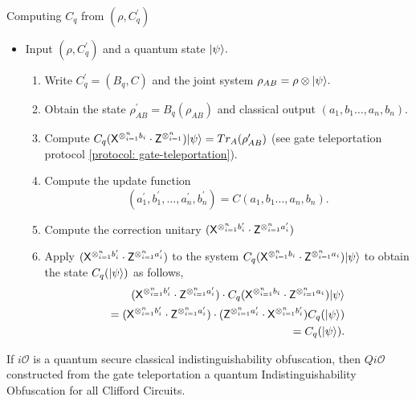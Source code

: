 \begin{algorithm}[H]
\label{Eval:Clifford-teleportation}
\caption{Computing $C_q$ from $\left(\rho,C_q^\prime \right)$}
 \begin{itemize}
  \item Input $\left(\rho,C_q^\prime \right)$ and a quantum state ${\lvert}\psi\rangle.$
  \begin{enumerate}
  \item   Write $C_q^\prime=(B_q, C)$ and the joint system $\rho_{AB}=\rho \otimes {\lvert}\psi\rangle.$
  \item   Obtain the state $\rho_{AB}^\prime=B_q(\rho_{AB})$ and classical output $(a_1,b_1\ldots,a_n,b_n).$ 
  \item   Compute $C_q({\sf X}^{\otimes_{i=1}^{n} b_{i}} \cdot {\sf Z}^{\otimes_{i=1}^{n}}){\lvert}\psi\rangle=Tr_A(\rho_{AB}^\prime)$ (see  gate teleportation protocol \ref{protocol: gate-teleportation}).
  \item   Compute the update function $$(a_1^\prime, b_1^\prime,\ldots, a_n^\prime, b_n^\prime)=C(a_1,b_1\ldots,a_n,b_n).$$
  \item    Compute the correction unitary $({\sf X}^{\otimes_{i=1}^{n} b_{i}^\prime} \cdot {\sf Z}^{\otimes_{i=1}^{n} a_{i}^\prime})$ 
  \item   Apply  $({\sf X}^{\otimes_{i=1}^{n} b_{i}^\prime} \cdot {\sf Z}^{\otimes_{i=1}^{n} a_{i}^\prime})$ to the system $C_q({\sf X}^{\otimes_{i=1}^{n} b_{i}} \cdot {\sf Z}^{\otimes_{i=1}^{n} a_{i}}){\lvert}\psi\rangle$ to obtain the state $C_q({\lvert}\psi\rangle)$ as follows,
  \begin{equation*}
  \begin{aligned}
 ({\sf X}^{\otimes_{i=1}^{n} b_{i}^\prime} \cdot {\sf Z}^{\otimes_{i=1}^{n} a_{i}^\prime}) \cdot C_q({\sf X}^{\otimes_{i=1}^{n} b_{i}} \cdot {\sf Z}^{\otimes_{i=1}^{n}a_{i}}){\lvert}\psi\rangle\\
 =({\sf X}^{\otimes_{i=1}^{n} b_{i}^\prime} \cdot {\sf Z}^{\otimes_{i=1}^{n} a_{i}^\prime}) \cdot ({\sf Z}^{\otimes_{i=1}^{n} a_{i}^\prime} \cdot {\sf X}^{\otimes_{i=1}^{n}b_{i}^\prime})C_q({\lvert}\psi\rangle)\\
 = C_q({\lvert}\psi\rangle).
 \end{aligned}
 \end{equation*}
  \end{enumerate}
  \end{itemize}
\end{algorithm}

\begin{theorem}
If $i\mathcal{O}$ is a quantum secure classical indistinguishability obfuscation, then $Qi\mathcal{O}$ constructed from the gate teleportation  a quantum Indistinguishability Obfuscation for all Clifford Circuits.
\end{theorem}

